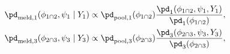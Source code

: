 \begin{gather}
  \pd_{\text{meld}, 1} (\phi_{1 \cap 2}, \psi_{1} \mid Y_{1}) \propto
  \pd_{\text{pool}, 1} (\phi_{1 \cap 2})
  \frac {
    \pd_{1}(\phi_{1 \cap 2}, \psi_{1}, Y_{1})
  } {
    \pd_{1}(\phi_{1 \cap 2})
  },
  \label{eqn:stage-one-targets-one} \\
  \pd_{\text{meld}, 3} (\phi_{2 \cap 3}, \psi_{3} \mid Y_{3}) \propto
  \pd_{\text{pool}, 3} (\phi_{2 \cap 3})
  \frac {
    \pd_{3}(\phi_{2 \cap 3}, \psi_{3}, Y_{3})
  } {
    \pd_{3}(\phi_{2 \cap 3})
  },
  \label{eqn:stage-one-targets-two}
\end{gather}